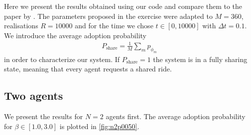 \documentclass[aps,pra,showpacs,preprintnumbers,amsmath,amssymb,nofootinbib]{revtex4-2}
\begin{document}
    Here we present the results obtained using our code and compare them to the paper by \citeauthor{Wolf_2022}.
    The parameters proposed in the exercise \cite{SC22} were adapted to $M = 360$, realisations $R = 10000$ and for the time we chose $t \in [0, 10000]$ with $\Delta t = 0.1$.
    We introduce the average adoption probability 
    \begin{align*}
        P_{\mathrm{share}} = \frac{1}{M} \sum_{m} p_{\phi_m}
    \end{align*}
    in order to characterize our system.
    If $P_{\mathrm{share}} = 1$ the system is in a fully sharing state, meaning that every agent requests a shared ride.


    \subsection{Two agents}
    We present the results for $N = 2$ agents first. 
    The average adoption probability for $\beta \in [1.0, 3.0]$ is plotted in \cref{fig:n2p0050}.
\end{document}
